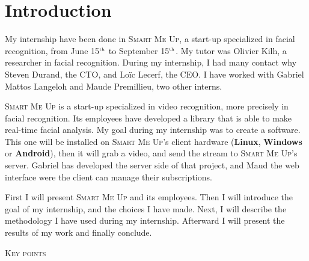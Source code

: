 \documentclass[a4paper,11pt]{custom}
\newcommand{\smu}{\textsc{Smart Me Up}}
\newcommand{\linux}{\textbf{Linux}\xspace}
\newcommand{\win}{\textbf{Windows}\xspace}
\newcommand{\android}{\textbf{Android}\xspace}
\newcommand{\nth}[1]{#1$^{\text{\tiny th}\xspace}$}
\begin{document}


\chapter{Introduction}

My internship have been done in \smu, a start-up specialized in facial
recognition, from June \nth{15} to September \nth{15}. My tutor was Olivier
Kilh, a researcher in facial recognition. During my internship, I had many
contact why Steven Durand, the CTO, and Loïc Lecerf, the CEO. I have worked with
Gabriel Mattos Langeloh and Maude Premillieu, two other interns.

\smu{} is a start-up specialized in video recognition, more precisely in facial
recognition. Its employees have developed a library that is able to make
real-time facial analysis. My goal during my internship was to create a
software. This one will be installed on \smu's client hardware (\linux, \win{}
or \android), then it will grab a video, and send the stream to \smu's server.
Gabriel has developed the server side of that project, and Maud the web
interface were the client can manage their subscriptions.

First I will present \smu{} and its employees. Then I will introduce the goal of
my internship, and the choices I have made. Next, I will describe the
methodology I have used during my internship. Afterward I will present the
results of my work and finally conclude.

\vspace{\fill}

\begin{center}
\textsc{\textsc{Key points}}
\end{center}
\end{document}
